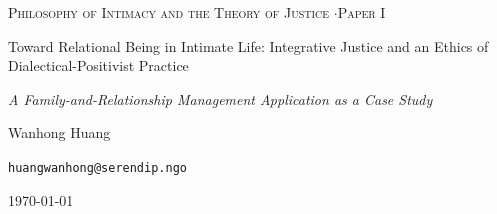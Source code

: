 \documentclass[11pt,a4paper]{article}
\begin{document}
\thispagestyle{empty}
\null\vfill
\begin{center}
{\footnotesize\color{rosedeep}\scshape Philosophy of Intimacy and the Theory of Justice \quad$\cdot$\quad Paper I\par}
\vspace{0.9em}
\coverrule\par
\vspace{1.6em}
{\color{warnred}\Large Toward Relational Being in Intimate Life: Integrative Justice and an Ethics of Dialectical-Positivist Practice\par}
\vspace{1.0em}
{\color{warnred}\large\itshape A Family-and-Relationship Management Application as a Case Study\par}
\vspace{2.4em}
\coverrule[0.25]\par
\vspace{1.4em}
{\large Wanhong Huang\par}
\vspace{0.5em}
{\footnotesize \texttt{huangwanhong@serendip.ngo}\par}
\vspace{1.2em}
{\today\par}
\end{center}
\vfill\null
\coverfootnote
\clearpage
\end{document}
